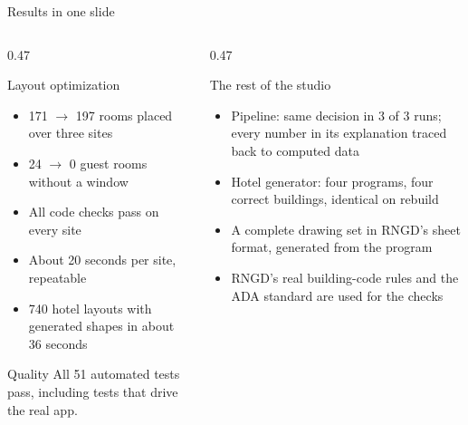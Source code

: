 \documentclass[9pt,aspectratio=169]{beamer}
\begin{document}
\begin{frame}{Results in one slide}
\begin{columns}[T]
\begin{column}{0.47\textwidth}
\begin{block}{Layout optimization}
\begin{itemize}
\item 171 $\rightarrow$ 197 rooms placed over three sites
\item 24 $\rightarrow$ 0 guest rooms without a window
\item All code checks pass on every site
\item About 20 seconds per site, repeatable
\item 740 hotel layouts with generated shapes in about 36 seconds
\end{itemize}
\end{block}
\begin{block}{Quality}
All 51 automated tests pass, including tests that drive the real app.
\end{block}
\end{column}
\begin{column}{0.47\textwidth}
\begin{block}{The rest of the studio}
\begin{itemize}
\item Pipeline: same decision in 3 of 3 runs; every number in its explanation traced back to computed data
\item Hotel generator: four programs, four correct buildings, identical on rebuild
\item A complete drawing set in RNGD's sheet format, generated from the program
\item RNGD's real building-code rules and the ADA standard are used for the checks
\end{itemize}
\end{block}
\end{column}
\end{columns}
\end{frame}
\end{document}
